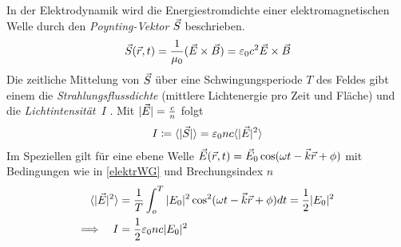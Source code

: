 In der Elektrodynamik wird die Energiestromdichte einer
elektromagnetischen Welle durch den 
\emph{Poynting-Vektor} $\vec{S}$%
%
beschrieben.
\begin{align*}
  \vec{S}(\vec{r},t)=\frac{1}{\mu_0}(\vec{E}\times\vec{B})=\varepsilon_0 c^2 \vec{E}\times\vec{B}
\end{align*}
Die zeitliche Mittelung von $\vec{S}$ über eine Schwingungsperiode $T$ des
Feldes gibt einem die
\emph{Strahlungsflussdichte} 
(mittlere Lichtenergie pro Zeit und Fläche) 
und die \emph{Lichtintensität~$I$}%
%
.
Mit $\vert\vec{E}\vert = \frac{c}{n}$ folgt
\begin{gather*}
  I \coloneqq \langle|\vec{S}|\rangle
  =\varepsilon_0 nc \langle|\vec{E}|^2\rangle
\end{gather*}
Im Speziellen gilt für eine ebene Welle
$\vec{E}(\vec{r},t)= \vec{E}_0 \cos(\omega t -\vec{k}\vec{r}+\phi)$
mit Bedingungen wie in \eqref{elektrWG} und Brechungsindex $n$
\begin{align*}
  \langle\vert\vec{E}\vert^2\rangle
  &=\frac{1}{T}\int_{o}^{T} \vert E_0\vert^2 
    \cos^2( \omega t-\vec{k}\vec{r}+\phi )dt
    =\frac{1}{2}\vert E_0\vert^2\\
  \Longrightarrow\quad I&=\frac{1}{2}\varepsilon_0 n c \vert E_0\vert^2
\end{align*}

